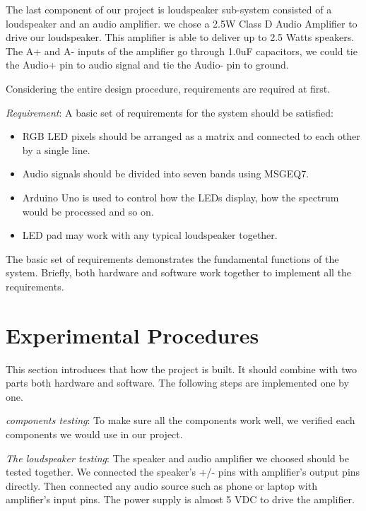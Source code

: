 \documentclass[12pt,a4paper,journal]{IEEEtran}
\begin{document}
The last component of our project is loudspeaker sub-system consisted of a loudspeaker and an audio amplifier. we chose a 2.5W Class D Audio Amplifier to drive our loudspeaker. This amplifier is able to deliver up to 2.5 Watts speakers. The A+ and A- inputs of the amplifier go through 1.0uF capacitors, we could tie the Audio+ pin to audio signal and tie the Audio- pin to ground.

Considering the entire design procedure, requirements are required at first.

\emph{Requirement}: A basic set of requirements for the system should be satisfied: 
\begin{itemize}
\item RGB LED pixels should be arranged as a matrix and connected to each other by a single line.
\item Audio signals should be divided into seven bands using MSGEQ7.
\item Arduino Uno is used to control how the LEDs display, how the spectrum would be processed and so on.
\item LED pad may work with any typical loudspeaker together.
\end{itemize}

The basic set of requirements demonstrates the fundamental functions of the system. Briefly, both hardware and software work together to implement all the requirements.
\section{Experimental Procedures}

This section introduces that how the project is built. It should combine with two parts both hardware and software. The following steps are implemented one by one.

\emph{components testing}: To make sure all the components work well, we  verified each components we would use in our project.

\emph{The loudspeaker testing}: The speaker and audio amplifier we choosed should be tested together. We connected the speaker's +/- pins with amplifier's output pins directly. Then connected any audio source such as phone or laptop with amplifier's input pins. The power supply is almost 5 VDC to drive the amplifier.
\end{document}
